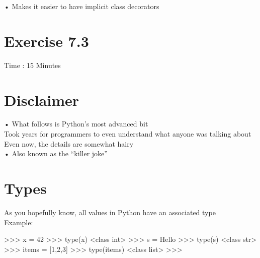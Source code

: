 \documentclass[
  letterpaper,
  DIV=11,
  numbers=noendperiod]{scrreprt}
\newenvironment{Shaded}{\begin{snugshade}}{\end{snugshade}}
\newcommand{\NormalTok}[1]{\textcolor[rgb]{0.00,0.23,0.31}{#1}}
\begin{document}
• Makes it easier to have implicit class decorators


\chapter{Exercise 7.3}\label{exercise-7.3}

Time : 15 Minutes


\chapter{Disclaimer}\label{disclaimer}

• What follows is Python's most advanced bit\\
Took years for programmers to even understand what anyone was talking
about\\
Even now, the details are somewhat hairy\\
• Also known as the ``killer joke''


\chapter{Types}\label{types}

As you hopefully know, all values in Python have an associated type\\
Example:

\begin{Shaded}
\begin{Highlighting}[]
\NormalTok{\textgreater{}\textgreater{}\textgreater{} x = 42  }
\NormalTok{\textgreater{}\textgreater{}\textgreater{} type(x)  }
\NormalTok{\textless{}class \textquotesingle{}int\textquotesingle{}\textgreater{}  }
\NormalTok{\textgreater{}\textgreater{}\textgreater{} s = \textquotesingle{}Hello\textquotesingle{}  }
\NormalTok{\textgreater{}\textgreater{}\textgreater{} type(s)  }
\NormalTok{\textless{}class \textquotesingle{}str\textquotesingle{}\textgreater{}  }
\NormalTok{\textgreater{}\textgreater{}\textgreater{} items = [1,2,3]  }
\NormalTok{\textgreater{}\textgreater{}\textgreater{} type(items)  }
\NormalTok{\textless{}class \textquotesingle{}list\textquotesingle{}\textgreater{}  }
\NormalTok{\textgreater{}\textgreater{}\textgreater{} }
\end{Highlighting}
\end{Shaded}
\end{document}
